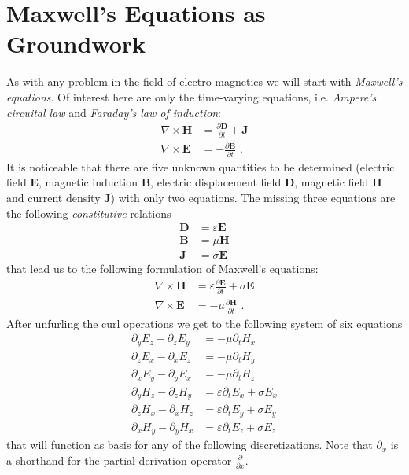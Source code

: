 \documentclass[]{report}
\begin{document}
\section{Maxwell's Equations as Groundwork}
As with any problem in the field of electro-magnetics we will start with \textit{Maxwell's equations}. Of interest here are only the time-varying equations, i.e. \textit{Ampere's circuital law} and \textit{Faraday's law of induction}:
\begin{align}
	\nabla \times \mathbf{H} &= \frac{\partial \mathbf{D}}{\partial t} + \mathbf{J} \\
	\nabla \times \mathbf{E} &= -\frac{\partial \mathbf{B}}{\partial t} \text{ .}
\end{align}
It is noticeable that there are five unknown quantities to be determined (electric field \(\mathbf{E}\), magnetic induction \(\mathbf{B}\), electric displacement field \(\mathbf{D}\), magnetic field \(\mathbf{H}\) and current density \(\mathbf{J}\)) with only two equations. The missing three equations are the following \textit{constitutive} relations
\begin{align}
	\mathbf{D} &= \varepsilon \mathbf{E} \\
	\mathbf{B} &= \mu \mathbf{H} \\
	\mathbf{J} &= \sigma \mathbf{E}
\end{align}
that lead us to the following formulation of Maxwell's equations:
\begin{align}
	\nabla \times \mathbf{H} &= \varepsilon \frac{\partial \mathbf{E}}{\partial t} + \sigma \mathbf{E} \\
	\nabla \times \mathbf{E} &= -\mu \frac{\partial \mathbf{H}}{\partial t} \text{ .}
\end{align}
After unfurling the curl operations we get to the following system of six equations
\begin{align}
	\partial_y E_z - \partial_z E_y &= -\mu \partial_t H_x \\
	\partial_z E_x - \partial_x E_z &= -\mu \partial_t H_y \\
	\partial_x E_y - \partial_y E_x &= -\mu \partial_t H_z \\
	\partial_y H_z - \partial_z H_y &= \varepsilon \partial_t E_x + \sigma E_x \\
	\partial_z H_x - \partial_x H_z &= \varepsilon \partial_t E_y + \sigma E_y \\
	\partial_x H_y - \partial_y H_x &= \varepsilon \partial_t E_z + \sigma E_z
\end{align}
that will function as basis for any of the following discretizations. Note that \(\partial_x\) is a shorthand for the partial derivation operator \(\frac{\partial}{\partial x}\).
\end{document}
